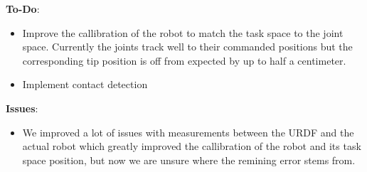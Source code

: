 \documentclass[12 pt]{article}
\begin{document}
\textbf{To-Do}:
    \begin{itemize}
        \item Improve the callibration of the robot to match the task space to the joint space. 
        Currently the joints track well to their commanded positions but the corresponding tip 
        position is off from expected by up to half a centimeter.
        \item Implement contact detection
    \end{itemize}

\textbf{Issues}:
    \begin{itemize}
        \item We improved a lot of issues with measurements between the URDF and
        the actual robot which greatly improved the callibration of the robot and 
        its task space position, but now we are unsure where the remining error
        stems from. 
    \end{itemize}
\end{document}
